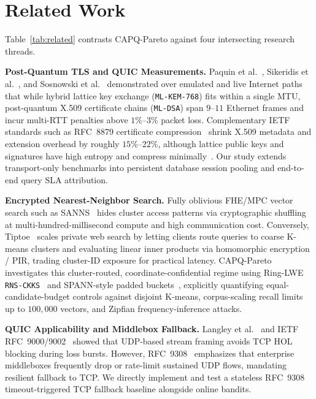 \documentclass[10pt,journal,compsoc]{IEEEtran}
\begin{document}
\section{Related Work}\label{sec:related}

Table~\ref{tab:related} contrasts CAPQ-Pareto against four intersecting research threads.

\smallskip\noindent \textbf{Post-Quantum TLS and QUIC Measurements.} Paquin et al.~\cite{paquin2020pqctls}, Sikeridis et al.~\cite{sikeridis2020pqctls}, and Sosnowski et al.~\cite{sosnowski2023pqctls} demonstrated over emulated and live Internet paths that while hybrid lattice key exchange (\texttt{ML-KEM-768}) fits within a single MTU, post-quantum X.509 certificate chains (\texttt{ML-DSA}) span $9\text{--}11$ Ethernet frames and incur multi-RTT penalties above $1\%\text{--}3\%$ packet loss. Complementary IETF standards such as RFC~8879 certificate compression~\cite{rfc8879} shrink X.509 metadata and extension overhead by roughly $15\%\text{--}22\%$, although lattice public keys and signatures have high entropy and compress minimally~\cite{sikeridis2020pqctls}. Our study extends transport-only benchmarks into persistent database session pooling and end-to-end query SLA attribution.

\smallskip\noindent \textbf{Encrypted Nearest-Neighbor Search.} Fully oblivious FHE/MPC vector search such as SANNS~\cite{chen2020sanns} hides cluster access patterns via cryptographic shuffling at multi-hundred-millisecond compute and high communication cost. Conversely, Tiptoe~\cite{henzinger2023tiptoe} scales private web search by letting clients route queries to coarse K-means clusters and evaluating linear inner products via homomorphic encryption / PIR, trading cluster-ID exposure for practical latency. CAPQ-Pareto investigates this cluster-routed, coordinate-confidential regime using Ring-LWE \texttt{RNS-CKKS}~\cite{cheon2017ckks,albadawi2022openfhe} and SPANN-style padded buckets~\cite{chen2021spann}, explicitly quantifying equal-candidate-budget controls against disjoint K-means, corpus-scaling recall limits up to $100{,}000$ vectors, and Zipfian frequency-inference attacks.

\smallskip\noindent \textbf{QUIC Applicability and Middlebox Fallback.} Langley et al.~\cite{langley2017quic} and IETF RFC~9000/9002~\cite{rfc9000,rfc9002} showed that UDP-based stream framing avoids TCP HOL blocking during loss bursts. However, RFC~9308~\cite{rfc9308} emphasizes that enterprise middleboxes frequently drop or rate-limit sustained UDP flows, mandating resilient fallback to TCP. We directly implement and test a stateless RFC~9308 timeout-triggered TCP fallback baseline alongside online bandits.
\end{document}
